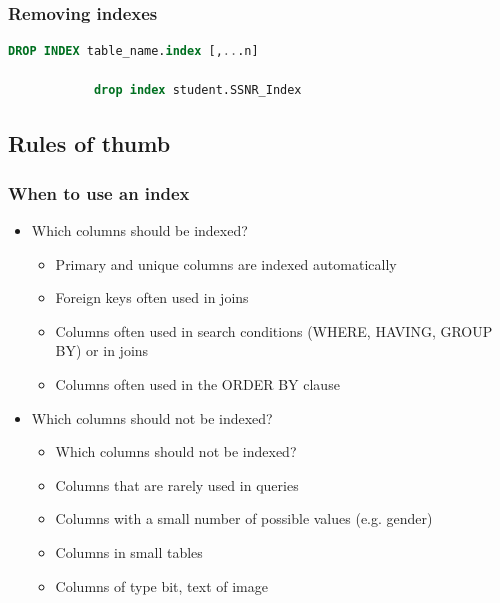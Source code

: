 \documentclass{report}
\begin{document}
        \subsubsection{Removing indexes}
        \begin{lstlisting}[language=SQL]
            DROP INDEX table_name.index [,...n]
            
            drop index student.SSNR_Index
        \end{lstlisting}
    \subsection{Rules of thumb}
    \subsubsection{When to use an index}
    \begin{itemize}
        \item Which columns should be indexed?
            \begin{itemize}
                \item Primary and unique columns are indexed automatically
                \item Foreign keys often used in joins
                \item Columns often used in search conditions (WHERE, HAVING, GROUP BY) or in joins
                \item Columns often used in the ORDER BY clause
            \end{itemize}
        \item Which columns should not be indexed?
            \begin{itemize}
                \item Which columns should not be indexed?
                \item Columns that are rarely used in queries
                \item Columns with a small number of possible values (e.g. gender)
                \item Columns in small tables
                \item Columns of type bit, text of image
            \end{itemize}
    \end{itemize}
\end{document}
